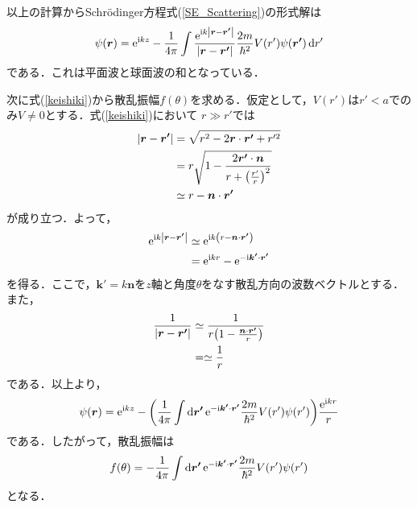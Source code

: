 \documentclass{report}
\begin{document}
  以上の計算からSchrödinger方程式(\ref{SE_Scattering})の形式解は
  \begin{align}
    \label{keishiki}
    \psi(\bm{r}) = \mathrm{e}^{\mathrm{i} kz} - \frac{1}{4\pi} \int \frac{\mathrm{e}^{\mathrm{i} k \abs{\bm{r} - \bm{r'}}}}{\abs{\bm{r} - \bm{r'}}} \frac{2m}{\hbar^2}V(r')\psi(\bm{r'}) \dd{r'}
  \end{align}
  である．これは平面波と球面波の和となっている．

  次に式(\ref{keishiki})から散乱振幅$f(\theta)$を求める．仮定として，$V(r')$は$r'<a$でのみ$V\neq 0$とする．式(\ref{keishiki})において
  $r  \gg r'$では
  \begin{align}
    \abs{\bm{r} - \bm{r'}} &= \sqrt{r^2 - 2\bm{r} \cdot \bm{r'} + r'^2}\\
    &= r \sqrt{1 - \frac{2\bm{r'} \cdot \bm{n}}{r + \qty(\frac{r'}{r})^2}}\\
    &\simeq r - \bm{n}\cdot\bm{r'}
  \end{align}
  が成り立つ．よって，
  \begin{align}
    \mathrm{e}^{\mathrm{i} k \abs{\bm{r} - \bm{r'}}} &\simeq \mathrm{e}^{\mathrm{i} k \qty(r - \bm{n} \cdot \bm{r'})}\\
    &= \mathrm{e}^{\mathrm{i} k r} - \mathrm{e}^{-\mathrm{i} \bm{k'} \cdot \bm{r'}}
  \end{align}
  を得る．ここで，$\bm{k'} = k \bm{n}$を$z$軸と角度$\theta$をなす散乱方向の波数ベクトルとする．また，
  \begin{align}
    \frac{1}{\abs{\bm{r} - \bm{r'}}} &\simeq \frac{1}{r\qty(1 - \frac{\bm{n}\cdot\bm{r'}}{r})}\\
    &= \simeq \frac{1}{r}
  \end{align}
  である．以上より，
  \begin{align}
    \psi(\bm{r}) = \mathrm{e}^{\mathrm{i} kz} - \qty(\frac{1}{4\pi} \int \dd{\bm{r'}} \mathrm{e}^{- \mathrm{i} \bm{k'} \cdot \bm{r'}} \frac{2m}{\hbar^2}V(r')\psi(r'))\frac{\mathrm{e}^{\mathrm{i} kr}}{r}
  \end{align}
  である．したがって，散乱振幅は
  \begin{align}
    f(\theta) = -\frac{1}{4\pi} \int \dd{\bm{r'}} \mathrm{e}^{- \mathrm{i} \bm{k'} \cdot \bm{r'}} \frac{2m}{\hbar^2}V(r')\psi(r')
  \end{align}
  となる．
\end{document}
